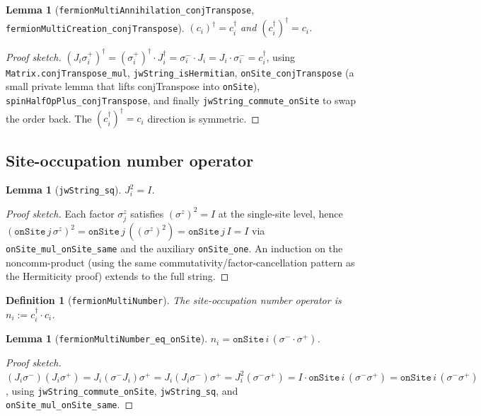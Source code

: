 \documentclass[a4paper,11pt]{article}
\newtheorem{lemma}[theorem]{Lemma}
\newtheorem{definition}[theorem]{Definition}
\begin{document}
\begin{lemma}[\texttt{fermionMultiAnnihilation\_conjTranspose},
            \texttt{fermionMultiCreation\_conjTranspose}]
$(c_i)^\dagger = c_i^\dagger$ and $(c_i^\dagger)^\dagger = c_i$.
\end{lemma}

\begin{proof}[Proof sketch]
$(J_i \sigma^+_i)^\dagger = (\sigma^+_i)^\dagger \cdot J_i^\dagger
 = \sigma^-_i \cdot J_i = J_i \cdot \sigma^-_i = c_i^\dagger$,
using \texttt{Matrix.conjTranspose\_mul},
\texttt{jwString\_isHermitian},
\texttt{onSite\_conjTranspose} (a small private lemma that lifts
conjTranspose into \texttt{onSite}),
\texttt{spinHalfOpPlus\_conjTranspose}, and finally
\texttt{jwString\_commute\_onSite} to swap the order back.  The
$(c_i^\dagger)^\dagger = c_i$ direction is symmetric.
\end{proof}

\subsection{Site-occupation number operator}

\begin{lemma}[\texttt{jwString\_sq}]
$J_i^2 = I$.
\end{lemma}

\begin{proof}[Proof sketch]
Each factor $\sigma^z_j$ satisfies $(\sigma^z)^2 = I$ at the
single-site level, hence
$(\texttt{onSite}\,j\,\sigma^z)^2 = \texttt{onSite}\,j\,((\sigma^z)^2) = \texttt{onSite}\,j\,I = I$
via \texttt{onSite\_mul\_onSite\_same} and the auxiliary
\texttt{onSite\_one}.  An induction on the noncomm-product (using
the same commutativity/factor-cancellation pattern as the Hermiticity
proof) extends to the full string.
\end{proof}

\begin{definition}[\texttt{fermionMultiNumber}]
The site-occupation number operator is $n_i := c_i^\dagger \cdot c_i$.
\end{definition}

\begin{lemma}[\texttt{fermionMultiNumber\_eq\_onSite}]
$n_i = \texttt{onSite}\,i\,(\sigma^- \cdot \sigma^+)$.
\end{lemma}

\begin{proof}[Proof sketch]
$(J_i \sigma^-)(J_i \sigma^+)
 = J_i (\sigma^- J_i) \sigma^+
 = J_i (J_i \sigma^-) \sigma^+
 = J_i^2 (\sigma^- \sigma^+)
 = I \cdot \texttt{onSite}\,i\,(\sigma^- \sigma^+)
 = \texttt{onSite}\,i\,(\sigma^- \sigma^+)$,
using \texttt{jwString\_commute\_onSite}, \texttt{jwString\_sq}, and
\texttt{onSite\_mul\_onSite\_same}.
\end{proof}
\end{document}
